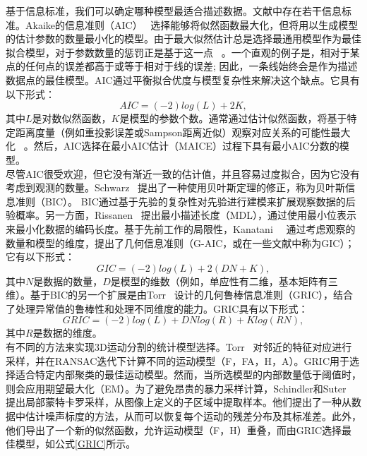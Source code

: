 基于信息标准，我们可以确定哪种模型最适合描述数据。文献中存在若干信息标准。Akaike的信息准则（AIC）~\cite{akaike1998information}
选择能够将似然函数最大化，但将用以生成模型的估计参数的数量最小化的模型。由于最大似然估计总是选择最通用模型作为最佳拟合模型，对于参数数量的惩罚正是基于这一点~\cite{faugeras1998geometric}
。一个直观的例子是，相对于某点的任何点的误差都高于或等于相对于线的误差; 因此，一条线始终会是作为描述数据点的最佳模型。AIC通过平衡拟合优度与模型复杂性来解决这个缺点。它具有以下形式：
\begin{equation}
AIC=(-2)log(L)+2K,
\end{equation}
其中$L$是对数似然函数，$K$是模型的参数个数。通常通过估计似然函数，将基于特定距离度量（例如重投影误差或Sampson距离近似）观察对应关系的可能性最大化~\cite{hartley2000multiple}
。然后，AIC选择在最小AIC估计（MAICE）过程下具有最小AIC分数的模型。\\

尽管AIC很受欢迎，但它没有渐近一致的估计值，并且容易过度拟合，因为它没有考虑到观测的数量。Schwarz~\cite{schwarz1978estimating}
提出了一种使用贝叶斯定理的修正，称为贝叶斯信息准则（BIC）。
BIC通过基于先验的复杂性对先验进行建模来扩展观察数据的后验概率。另一方面，Rissanen~\cite{rissanen1984universal}
提出最小描述长度（MDL），通过使用最小位表示来最小化数据的编码长度。基于先前工作的局限性，Kanatani~\cite{kanatani2005statistical}~\cite{kanatani2001motion}
通过考虑观察的数量和模型的维度，提出了几何信息准则（G-AIC，或在一些文献中称为GIC）；它有以下形式：
\begin{equation}
GIC=(-2)log(L)+2(DN+K),
\end{equation}
其中$N$是数据的数量，$D$是模型的维数（例如，单应性有二维，基本矩阵有三维）。基于BIC的另一个扩展是由Torr~\cite{faugeras1998geometric}
设计的几何鲁棒信息准则（GRIC），结合了处理异常值的鲁棒性和处理不同维度的能力。GRIC具有以下形式：
\begin{equation}\label{GRIC}
GRIC=(-2)log(L)+DNlog(R)+Klog(RN),
\end{equation}
其中$R$是数据的维度。\\

有不同的方法来实现3D运动分割的统计模型选择。Torr~\cite{faugeras1998geometric}
对邻近的特征对应进行采样，并在RANSAC迭代下计算不同的运动模型（F，FA，H，A）。GRIC用于选择适合特定内部聚类的最佳运动模型。然而，当所选模型的内部数量低于阈值时，则会应用期望最大化（EM）。为了避免昂贵的暴力采样计算，Schindler和Suter~\cite{schindler2005two}~\cite{schindler2006two}
提出局部蒙特卡罗采样，从图像上定义的子区域中提取样本。他们提出了一种从数据中估计噪声标度的方法，从而可以恢复每个运动的残差分布及其标准差。此外，他们导出了一个新的似然函数，允许运动模型（F，H）重叠，而由GRIC选择最佳模型，如公式\ref{GRIC}所示。\\

